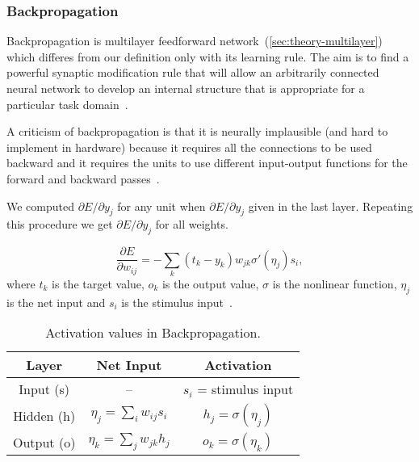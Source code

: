 \subsubsection{Backpropagation}
\label{sec:models-bp} 

Backpropagation is multilayer feedforward network~(\ref{sec:theory-multilayer}) which differes from our definition only with its learning rule. The aim is to find a powerful synaptic modification rule that will allow an arbitrarily connected neural network to develop an internal structure that is appropriate for a particular task domain~\citep{rumelhart1986learning}. 

A criticism of backpropagation is that it is neurally implausible (and hard to implement in hardware) because it requires all the connections to be used backward and it requires the units to use different input-output functions for the forward and backward passes~\citep{hinton1988learning}.

We computed $\partial E / \partial y_j$ for any unit when $\partial E / \partial y_j$ given in the last layer. Repeating this procedure we get $\partial E / \partial y_j$ for all weights. 

\begin{equation} 
\frac{\partial E}{\partial w_{ij}} = -\sum_k(t_k-y_k)w_{jk}\sigma'(\eta_j)s_i,
\end{equation}
where $t_k$ is the target value, $o_k$ is the output value, $\sigma$ is the nonlinear function, $\eta_j$ is the net input and $s_i$ is the stimulus input~\citet{o1996bio}.

\begin{table}[H] 
  \centering
  \begin{tabular}{|ccc|}
    \hline
    Layer & Net Input & Activation\\
    \hline
    Input (s)  & -- & $s_i$ = stimulus input\\
    \hline
    Hidden (h) & \hspace{0.3cm} $\eta_j = \sum_i w_{ij}s_i$ \hspace{0.3cm} &
    $h_j = \sigma(\eta_j)$\hspace{0.3cm}\\
    \hline
    Output (o) & \hspace{0.3cm} $\eta_k = \sum_j w_{jk}h_j$ \hspace{0.3cm} & 
    $o_k = \sigma(\eta_k)$\hspace{0.3cm}\\
    \hline
  \end{tabular}
  \caption{Activation values in Backpropagation.}
  \label{tab:models-bp}
\end{table}
